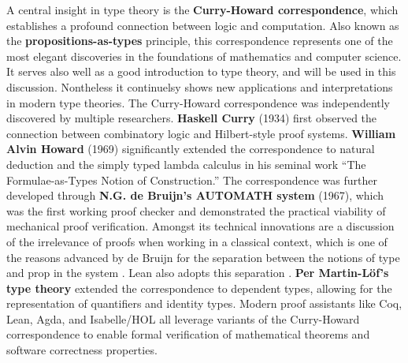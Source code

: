 A central insight in type theory is the \textbf{Curry-Howard correspondence}, 
which establishes a profound connection between logic and computation. 
Also known as the \textbf{propositions-as-types} principle, this correspondence 
represents one of the most elegant discoveries in the foundations 
of mathematics and computer science.
It serves also well as a good introduction to type theory, and will be used in this discussion.
Nontheless it continuelsy shows new applications and interpretations in modern type theories.
The Curry-Howard correspondence was independently discovered by multiple researchers.
\textbf{Haskell Curry} (1934) first observed the connection between combinatory logic and 
Hilbert-style proof systems.
\textbf{William Alvin Howard} (1969) significantly extended the correspondence to natural deduction 
and the simply typed lambda calculus in his seminal work ``The Formulae-as-Types Notion of Construction.'' 
The correspondence was further developed through \textbf{N.G. de Bruijn's AUTOMATH system} (1967), 
which was the first working proof checker and demonstrated the practical viability of mechanical 
proof verification. Amongst its technical innovations are a discussion of the
irrelevance of proofs when working in a classical context, which is one
of the reasons advanced by de Bruijn for the separation between the notions of 
type and prop in the system \cite{thompson1999types}. Lean also adopts this separation .
\textbf{Per Martin-L\"{o}f's type theory} extended the correspondence to
dependent types, allowing for the representation of quantifiers and identity types.
Modern proof assistants like Coq, Lean, Agda, and Isabelle/HOL all leverage 
variants of the Curry-Howard correspondence to enable formal verification of mathematical theorems 
and software correctness properties.


